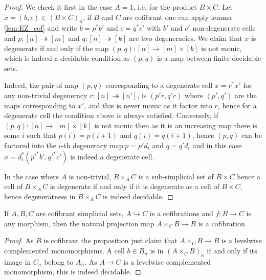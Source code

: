 \documentclass[reqno,10pt,a4paper,oneside,draft]{amsart}
\begin{document}
\begin{proof}
We check it first in the case $A=1$, i.e. for the product $B \times C$. Let $x = (b,c) \in (B \times C)_n$, if $B$ and $C$ are cofibrant one can apply lemma \ref{lem:EZ_cof} and write $b=p^* b'$ and $c=q^* c'$ with $b'$ and $c'$ non-degenerate cells and $p:[n] \twoheadrightarrow [m]$ and $q:[n] \twoheadrightarrow [k]$ are two degeneracies. We claim that $x$ is degenerate if and only if the map $(p,q):[n] \rightarrow [m] \times [k]$ is not monic, which is indeed a decidable condition as $(p,q)$ is a map between finite decidable sets.

Indeed, the pair of map $(p,q)$ corresponding to a degenerate cell $x=r^* x'$ for any non-trivial degeneracy $r:[n] \twoheadrightarrow [n']$, is  $(p'r,q'r)$ where $(p',q')$ are the maps corresponding to $x'$, and this is never monic as it factor into $r$, hence for a degenerate cell the condition above is always satisfied. Conversely, if $(p,q): [n] \rightarrow [m] \times [k]$ is not monic then as it is an increasing map there is some $i$ such that $p(i)=p(i+1)$ and $q(i)=q(i+1)$, hence $(p,q)$ can be factored into the $i$-th degeneracy map:$p=p' d_i$ and $q=q' d_i$ and in this case $x= d_i^* (p'^* b',q'^* c')$ is indeed a degenerate cell.


In the case where $A$ is non-trivial, $B \times_A C$ is a sub-simplicial set of $B \times C$ hence a cell of $B \times_A C$ is degenerate if and only if it is degenerate as a cell of $B \times C$, hence degeneratness in $B \times_A C$ is indeed decidable. 
\end{proof}


\begin{proposition} \label{thm:cof-pbk} If $A,B,C$ are cofibrant simplicial sets, $A \hookrightarrow C$ is a cofibrations and $f:B \rightarrow C$ is any morphism, then the natural projection map $A \times_C B \rightarrow B$ is a cofibration.
\end{proposition}

\begin{proof} As $B$ is cofibrant the proposition just claim that $A \times_C B \rightarrow B$ is a levelwise complemented monomorphisms. A cell $b \in B_n$ is in  $(A \times_C B)_n$ if and only if its image in $C_n$ belong to $A_n$. As $A \rightarrow C$ is a levelwise complemented monomorphism, this is indeed decidable.
\end{proof} 



\end{document}
